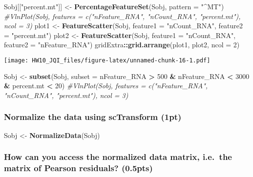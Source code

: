 \documentclass[]{article}
\newenvironment{Shaded}{\begin{snugshade}}{\end{snugshade}}
\newcommand{\KeywordTok}[1]{\textcolor[rgb]{0.13,0.29,0.53}{\textbf{#1}}}
\newcommand{\DataTypeTok}[1]{\textcolor[rgb]{0.13,0.29,0.53}{#1}}
\newcommand{\DecValTok}[1]{\textcolor[rgb]{0.00,0.00,0.81}{#1}}
\newcommand{\StringTok}[1]{\textcolor[rgb]{0.31,0.60,0.02}{#1}}
\newcommand{\CommentTok}[1]{\textcolor[rgb]{0.56,0.35,0.01}{\textit{#1}}}
\newcommand{\OperatorTok}[1]{\textcolor[rgb]{0.81,0.36,0.00}{\textbf{#1}}}
\newcommand{\NormalTok}[1]{#1}
\begin{document}
\begin{Shaded}
\begin{Highlighting}[]
\NormalTok{Sobj[[}\StringTok{"percent.mt"}\NormalTok{]] <-}\StringTok{ }\KeywordTok{PercentageFeatureSet}\NormalTok{(Sobj, }\DataTypeTok{pattern =} \StringTok{"^MT"}\NormalTok{)}
\CommentTok{#VlnPlot(Sobj, features = c("nFeature_RNA", "nCount_RNA", "percent.mt"), ncol = 3)}
\NormalTok{plot1 <-}\StringTok{ }\KeywordTok{FeatureScatter}\NormalTok{(Sobj, }\DataTypeTok{feature1 =} \StringTok{"nCount_RNA"}\NormalTok{, }\DataTypeTok{feature2 =} \StringTok{"percent.mt"}\NormalTok{)}
\NormalTok{plot2 <-}\StringTok{ }\KeywordTok{FeatureScatter}\NormalTok{(Sobj, }\DataTypeTok{feature1 =} \StringTok{"nCount_RNA"}\NormalTok{, }\DataTypeTok{feature2 =} \StringTok{"nFeature_RNA"}\NormalTok{)}
\NormalTok{gridExtra}\OperatorTok{::}\KeywordTok{grid.arrange}\NormalTok{(plot1, plot2, }\DataTypeTok{ncol =} \DecValTok{2}\NormalTok{)}
\end{Highlighting}
\end{Shaded}

\texttt{[image: HW10\_JQI\_files/figure-latex/unnamed-chunk-16-1.pdf]}

\begin{Shaded}
\begin{Highlighting}[]
\NormalTok{Sobj <-}\StringTok{ }\KeywordTok{subset}\NormalTok{(Sobj, }\DataTypeTok{subset =}\NormalTok{ nFeature_RNA }\OperatorTok{>}\StringTok{ }\DecValTok{500} \OperatorTok{&}\StringTok{ }\NormalTok{nFeature_RNA }\OperatorTok{<}\StringTok{ }\DecValTok{3000} \OperatorTok{&}\StringTok{ }\NormalTok{percent.mt }\OperatorTok{<}\StringTok{ }\DecValTok{20}\NormalTok{)}
\CommentTok{#VlnPlot(Sobj, features = c("nFeature_RNA", "nCount_RNA", "percent.mt"), ncol = 3)}
\end{Highlighting}
\end{Shaded}

\subsubsection{Normalize the data using scTransform
(1pt)}\label{normalize-the-data-using-sctransform-1pt}

\begin{Shaded}
\begin{Highlighting}[]
\NormalTok{Sobj <-}\StringTok{ }\KeywordTok{NormalizeData}\NormalTok{(Sobj)}
\end{Highlighting}
\end{Shaded}

\subsubsection{How can you access the normalized data matrix, i.e.~the
matrix of Pearson residuals?
(0.5pts)}\label{how-can-you-access-the-normalized-data-matrix-i.e.the-matrix-of-pearson-residuals-0.5pts}
\end{document}
